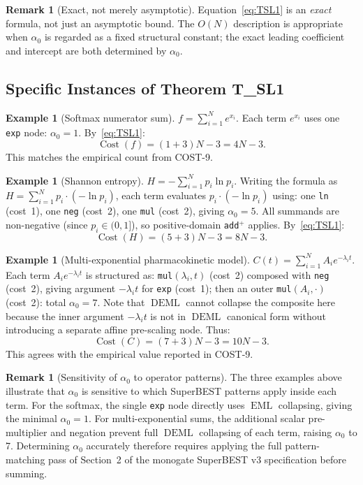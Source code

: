 \documentclass[12pt,a4paper]{article}
\theoremstyle{definition}
\newtheorem{remark}[theorem]{Remark}
\newtheorem{example}[theorem]{Example}
\newcommand{\EML}{\operatorname{EML}}
\newcommand{\DEML}{\operatorname{DEML}}
\newcommand{\Cost}{\operatorname{Cost}}
\begin{document}
\begin{remark}[Exact, not merely asymptotic]
Equation~\eqref{eq:TSL1} is an \emph{exact} formula, not just an asymptotic
bound.  The $O(N)$ description is appropriate when $\alpha_0$ is regarded as
a fixed structural constant; the exact leading coefficient and intercept are
both determined by $\alpha_0$.
\end{remark}

\subsection{Specific Instances of Theorem T\_SL1}
\label{subsec:instances}

\begin{example}[Softmax numerator sum]
\label{ex:softmax}
$f = \sum_{i=1}^{N} e^{x_i}$.
Each term $e^{x_i}$ uses one \texttt{exp} node: $\alpha_0 = 1$.
By~\eqref{eq:TSL1}:
\[
  \Cost(f) = (1 + 3)N - 3 = 4N - 3.
\]
This matches the empirical count from COST-9.
\end{example}

\begin{example}[Shannon entropy]
\label{ex:entropy}
$H = -\sum_{i=1}^{N} p_i \ln p_i$.
Writing the formula as $H = \sum_{i=1}^{N} p_i \cdot (-\ln p_i)$, each term
evaluates $p_i \cdot (-\ln p_i)$ using: one \texttt{ln} (cost~1), one
\texttt{neg} (cost~2), one \texttt{mul} (cost~2), giving $\alpha_0 = 5$.
All summands are non-negative (since $p_i \in (0,1]$), so positive-domain
\texttt{add}$^+$ applies.  By~\eqref{eq:TSL1}:
\[
  \Cost(H) = (5 + 3)N - 3 = 8N - 3.
\]
\end{example}

\begin{example}[Multi-exponential pharmacokinetic model]
\label{ex:pk}
$C(t) = \sum_{i=1}^{N} A_i e^{-\lambda_i t}$.
Each term $A_i e^{-\lambda_i t}$ is structured as:
\texttt{mul}$(\lambda_i, t)$ (cost~2) composed with \texttt{neg} (cost~2),
giving argument $-\lambda_i t$ for \texttt{exp} (cost~1); then an outer
\texttt{mul}$(A_i, \cdot)$ (cost~2): total $\alpha_0 = 7$.  Note that
$\DEML$ cannot collapse the composite here because the inner argument
$-\lambda_i t$ is not in $\DEML$ canonical form without introducing a
separate affine pre-scaling node.  Thus:
\[
  \Cost(C) = (7 + 3)N - 3 = 10N - 3.
\]
This agrees with the empirical value reported in COST-9.
\end{example}

\begin{remark}[Sensitivity of $\alpha_0$ to operator patterns]
The three examples above illustrate that $\alpha_0$ is sensitive to which
SuperBEST patterns apply inside each term.  For the softmax, the single
\texttt{exp} node directly uses $\EML$ collapsing, giving the minimal
$\alpha_0 = 1$.  For multi-exponential sums, the additional scalar
pre-multiplier and negation prevent full $\DEML$ collapsing of each term,
raising $\alpha_0$ to 7.  Determining $\alpha_0$ accurately therefore
requires applying the full pattern-matching pass of Section~2 of the
monogate SuperBEST v3 specification before summing.
\end{remark}
\end{document}

